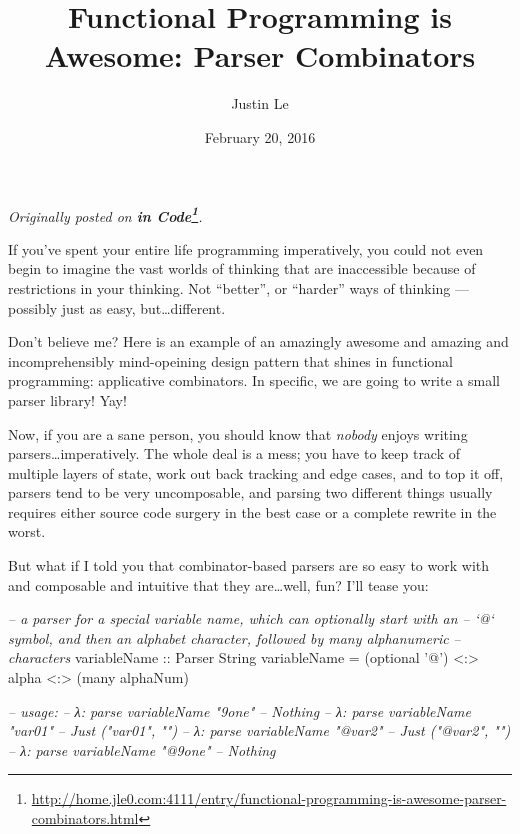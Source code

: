 \documentclass[]{article}
\title{Functional Programming is Awesome: Parser Combinators}
\author{Justin Le}
\date{February 20, 2016}
\newenvironment{Shaded}{}{}
\newcommand{\DataTypeTok}[1]{\textcolor[rgb]{0.56,0.13,0.00}{{#1}}}
\newcommand{\CharTok}[1]{\textcolor[rgb]{0.25,0.44,0.63}{{#1}}}
\newcommand{\CommentTok}[1]{\textcolor[rgb]{0.38,0.63,0.69}{\textit{{#1}}}}
\newcommand{\OtherTok}[1]{\textcolor[rgb]{0.00,0.44,0.13}{{#1}}}
\newcommand{\FunctionTok}[1]{\textcolor[rgb]{0.02,0.16,0.49}{{#1}}}
\newcommand{\NormalTok}[1]{{#1}}
\renewcommand{\href}[2]{#2\footnote{\url{#1}}}
\begin{document}
\maketitle

\emph{Originally posted on
\textbf{\href{http://home.jle0.com:4111/entry/functional-programming-is-awesome-parser-combinators.html}{in
Code}}.}

If you've spent your entire life programming imperatively, you could not
even begin to imagine the vast worlds of thinking that are inaccessible
because of restrictions in your thinking. Not ``better'', or ``harder''
ways of thinking --- possibly just as easy, but\ldots{}different.

Don't believe me? Here is an example of an amazingly awesome and amazing
and incomprehensibly mind-opeining design pattern that shines in
functional programming: applicative combinators. In specific, we are
going to write a small parser library! Yay!

Now, if you are a sane person, you should know that \emph{nobody} enjoys
writing parsers\ldots{}imperatively. The whole deal is a mess; you have
to keep track of multiple layers of state, work out back tracking and
edge cases, and to top it off, parsers tend to be very uncomposable, and
parsing two different things usually requires either source code surgery
in the best case or a complete rewrite in the worst.

But what if I told you that combinator-based parsers are so easy to work
with and composable and intuitive that they are\ldots{}well, fun? I'll
tease you:

\begin{Shaded}
\begin{Highlighting}[]
\CommentTok{-- a parser for a special variable name, which can optionally start with an}
\CommentTok{-- `@` symbol, and then an alphabet character, followed by many alphanumeric}
\CommentTok{-- characters}
\OtherTok{variableName ::} \DataTypeTok{Parser} \DataTypeTok{String}
\NormalTok{variableName }\FunctionTok{=} \NormalTok{(optional }\CharTok{'@'}\NormalTok{) }\FunctionTok{<:>} \NormalTok{alpha }\FunctionTok{<:>} \NormalTok{(many alphaNum)}

\CommentTok{-- usage:}
\CommentTok{-- λ: parse variableName "9one"}
\CommentTok{-- Nothing}
\CommentTok{-- λ: parse variableName "var01"}
\CommentTok{-- Just ("var01", "")}
\CommentTok{-- λ: parse variableName "@var2"}
\CommentTok{-- Just ("@var2", "")}
\CommentTok{-- λ: parse variableName "@9one"}
\CommentTok{-- Nothing}
\end{Highlighting}
\end{Shaded}
\end{document}
